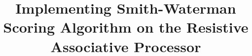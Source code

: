 \documentclass[pageno]{jpaper}
\begin{document}
	
	\title{Implementing Smith-Waterman Scoring Algorithm on the Resistive Associative Processor}
	
	\date{}
	\maketitle
	
	\thispagestyle{empty}
	
	\begin{abstract}

	\end{abstract}
	
	
	
%	
%	
%	
%	
	
	
	
	
	
\end{document}
